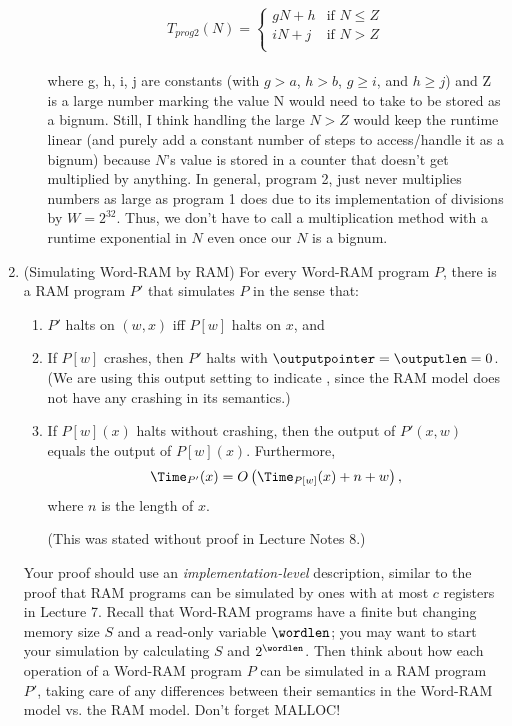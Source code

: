 \documentclass[11pt]{article}
\begin{document}
\begin{enumerate}
\begin{enumerate}
        \[
        T_{prog2}(N) =
        \begin{cases} 
            gN + h & \text{if } N \leq Z \\
            iN + j& \text{if } N > Z\\
        \end{cases}
        \] \\

        where g, h, i, j are constants (with $g > a$, $h > b$, $g \geq i$, and $h \geq j$) and Z is a large number marking the value N would need to take to be stored as a bignum. Still, I think handling the large $N > Z$ would keep the runtime linear (and purely add a constant number of steps to access/handle it as a bignum) because $N$'s value is stored in a counter that doesn't get multiplied by anything. In general, program 2, just never multiplies numbers as large as program 1 does due to its implementation of divisions by $W = 2^{32}$. Thus, we don't have to call a multiplication method with a runtime exponential in $N$ even once our $N$ is a bignum.  

\end{enumerate}

\item (Simulating Word-RAM by RAM) For every Word-RAM program $P$, there is a RAM program $P'$ that simulates $P$ in the sense that:
\begin{enumerate}
    \item $P'$ halts on $(w,x)$ iff $P[w]$ halts on $x$, and 
    \item If $P[w]$ crashes, then $P'$ halts with $\outputpointer=\outputlen=0$. (We are using this output setting to indicate \crash, since the RAM model does not have any crashing in its semantics.)
    \item If $P[w](x)$ halts without crashing, then the output of $P'(x,w)$ equals the output of $P[w](x)$.
     Furthermore,   
       $$\Time_{P'}(x) = O\left(\Time_{P[w]}(x)+n+w\right),$$
where $n$ is the length of $x$.

(This was stated without proof in Lecture Notes 8.) 

\end{enumerate}

Your proof should use an {\em implementation-level} description, similar to the proof that RAM programs can be simulated by ones with at most $c$ registers in Lecture 7.  Recall that Word-RAM programs have a finite but changing memory size $S$ and a read-only variable $\wordlen$; you may want to start your simulation by calculating $S$ and $2^{\wordlen}$.  Then think about how each operation of a Word-RAM program $P$ can be simulated in a RAM program $P'$, taking care of any differences between their semantics in the Word-RAM model vs. the RAM model. Don't forget MALLOC! \\


\end{enumerate}
\end{document}
